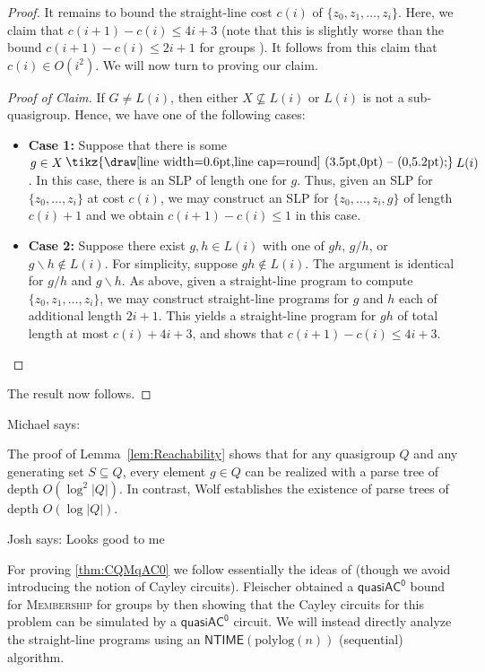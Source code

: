 \documentclass{theoretics}
\newcommand{\jsay}[1]{{\color{red} Josh says: #1}}
\newcommand{\msay}[1]{{\color{blue} Michael says: #1}}
\newcommand{\algprobm}[1]{\textsc{#1}\xspace}
\renewcommand{\setminus}{\mysetminus}
\newcommand{\mysetminusD}{\raisebox{.8pt}{\hbox{\tikz{\draw[line width=0.6pt,line cap=round] (3.5pt,0pt) -- (0,5.2pt);}}}}
\newcommand{\mysetminusT}{\mysetminusD}
\newcommand{\mysetminusS}{\raisebox{.5pt}{\hbox{\tikz{\draw[line width=0.45pt,line cap=round] (2.2pt,0) -- (0,3.8pt);}}}}
\newcommand{\mysetminusSS}{\raisebox{.35pt}{\hbox{\tikz{\draw[line width=0.4pt,line cap=round] (1.5pt,0) -- (0,2.8pt);}}}}
\newcommand{\mysetminus}{\mathbin{\mathchoice{\mysetminusD}{\mysetminusT}{\mysetminusS}{\mysetminusSS}}}
\newcommand*{\ComplexityClass}[1]{\ensuremath{\mathsf{#1}}\xspace}
\newcommand{\qACz}{\ComplexityClass{quasiAC^0}}
\newcommand{\NTIME}{\ComplexityClass{NTIME}}
\begin{document}
\begin{proof}
It remains to bound the straight-line cost $c(i)$ of $\{z_0, z_{1}, \ldots, z_{i}\}$. Here, we claim that $c(i+1) - c(i) \leq 4i+3$ (note that this is slightly worse than the bound $c(i+1) - c(i) \leq 2i+1$ for groups \cite{BabaiSzemeredi}). It follows from this claim that $c(i) \in O(i^2)$. We will now turn to proving our claim.

\begin{proof}[Proof of Claim]
If $G \neq L(i)$, then either $X \not\subseteq L(i)$ or $L(i)$ is not a sub-quasigroup. Hence, we have one of the following cases:
\begin{itemize}
    \item \textbf{Case 1:} Suppose that there is some $g \in X \setminus L(i)$. In this case, there is an SLP of length one for $g$.
    Thus, given an SLP for $\{ z_0, \ldots, z_i\}$ at cost $c(i)$, we may construct an SLP for $\{ z_0, \ldots, z_i,g\}$ of length $c(i) + 1$ and we obtain $c(i+1) - c(i) \leq 1$ in this case.


    \item \textbf{Case 2:} Suppose there exist $g,h \in L(i)$ with one of $gh$, $g/h$, or $g\backslash h \not \in L(i)$. For simplicity, suppose $gh \not \in L(i).$ The argument is identical for $g/h$ and  $g\backslash h$. As above, given a straight-line program to compute $\{z_0, z_1, \ldots, z_i\}$, we may construct straight-line programs for $g$ and $h$ each of additional length $2i+1$. This yields a straight-line program for $gh$ of total length at most $c(i) + 4i+3$, and shows that $c(i+1) - c(i) \leq 4i+3$.\qedhere 
\end{itemize} 
\end{proof}
\noindent The result now follows.
\end{proof}

\msay{
\begin{remark}
The proof of Lemma~\ref{lem:Reachability} shows that for any quasigroup $Q$ and any generating set $S \subseteq Q$, every element $g \in Q$ can be realized with a parse tree of depth $O(\log^2 |Q|)$. In contrast, Wolf \cite{Wolf} establishes the existence of parse trees of depth $O(\log |Q|)$.   
\end{remark}
}
\jsay{Looks good to me}

For proving \cref{thm:CQMqAC0} we follow essentially the ideas of \cite{Fleischer} (though we avoid introducing the notion of Cayley circuits). Fleischer obtained a $\qACz$ bound for \algprobm{Membership} for groups by then showing that the Cayley circuits for this problem can be simulated by a $\qACz$ circuit. We will instead directly analyze the straight-line programs using an $\NTIME(\text{polylog}(n))$ (sequential) algorithm.
\end{document}
